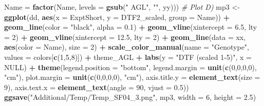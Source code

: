 \documentclass[
]{article}
\newenvironment{Shaded}{\begin{snugshade}}{\end{snugshade}}
\newcommand{\CommentTok}[1]{\textcolor[rgb]{0.56,0.35,0.01}{\textit{#1}}}
\newcommand{\DataTypeTok}[1]{\textcolor[rgb]{0.13,0.29,0.53}{#1}}
\newcommand{\DecValTok}[1]{\textcolor[rgb]{0.00,0.00,0.81}{#1}}
\newcommand{\FloatTok}[1]{\textcolor[rgb]{0.00,0.00,0.81}{#1}}
\newcommand{\KeywordTok}[1]{\textcolor[rgb]{0.13,0.29,0.53}{\textbf{#1}}}
\newcommand{\NormalTok}[1]{#1}
\newcommand{\OperatorTok}[1]{\textcolor[rgb]{0.81,0.36,0.00}{\textbf{#1}}}
\newcommand{\OtherTok}[1]{\textcolor[rgb]{0.56,0.35,0.01}{#1}}
\newcommand{\StringTok}[1]{\textcolor[rgb]{0.31,0.60,0.02}{#1}}
\begin{document}
\begin{Shaded}
\begin{Highlighting}[]
{{{{{{{         \DataTypeTok{Name =} \KeywordTok{factor}\NormalTok{(Name, }\DataTypeTok{levels =} \KeywordTok{gsub}\NormalTok{(}\StringTok{" AGL"}\NormalTok{, }\StringTok{""}\NormalTok{, yy)))}
\CommentTok{# Plot D)}
\NormalTok{mp3 <-}\StringTok{ }\KeywordTok{ggplot}\NormalTok{(dd, }\KeywordTok{aes}\NormalTok{(}\DataTypeTok{x =}\NormalTok{ ExptShort, }\DataTypeTok{y =}\NormalTok{ DTF2_scaled, }\DataTypeTok{group =}\NormalTok{ Name)) }\OperatorTok{+}\StringTok{ }
\StringTok{  }\KeywordTok{geom_line}\NormalTok{(}\DataTypeTok{color =} \StringTok{"black"}\NormalTok{, }\DataTypeTok{alpha =} \FloatTok{0.1}\NormalTok{) }\OperatorTok{+}
\StringTok{  }\KeywordTok{geom_vline}\NormalTok{(}\DataTypeTok{xintercept =} \FloatTok{6.5}\NormalTok{,  }\DataTypeTok{lty =} \DecValTok{2}\NormalTok{) }\OperatorTok{+}\StringTok{ }
\StringTok{  }\KeywordTok{geom_vline}\NormalTok{(}\DataTypeTok{xintercept =} \FloatTok{12.5}\NormalTok{, }\DataTypeTok{lty =} \DecValTok{2}\NormalTok{) }\OperatorTok{+}
\StringTok{  }\KeywordTok{geom_line}\NormalTok{(}\DataTypeTok{data =}\NormalTok{ xx, }\KeywordTok{aes}\NormalTok{(}\DataTypeTok{color =}\NormalTok{ Name), }\DataTypeTok{size =} \DecValTok{2}\NormalTok{) }\OperatorTok{+}\StringTok{ }
\StringTok{  }\KeywordTok{scale_color_manual}\NormalTok{(}\DataTypeTok{name =} \StringTok{"Genotype"}\NormalTok{, }\DataTypeTok{values =}\NormalTok{ colors[}\KeywordTok{c}\NormalTok{(}\DecValTok{1}\NormalTok{,}\DecValTok{5}\NormalTok{,}\DecValTok{8}\NormalTok{)]) }\OperatorTok{+}
\StringTok{  }\NormalTok{theme_AGL }\OperatorTok{+}\StringTok{ }\KeywordTok{labs}\NormalTok{(}\DataTypeTok{y =} \StringTok{"DTF (scaled 1-5)"}\NormalTok{, }\DataTypeTok{x =} \OtherTok{NULL}\NormalTok{) }\OperatorTok{+}
\StringTok{  }\KeywordTok{theme}\NormalTok{(}\DataTypeTok{legend.position =} \StringTok{"bottom"}\NormalTok{, }\DataTypeTok{legend.margin =} \KeywordTok{unit}\NormalTok{(}\KeywordTok{c}\NormalTok{(}\DecValTok{0}\NormalTok{,}\DecValTok{0}\NormalTok{,}\DecValTok{0}\NormalTok{,}\DecValTok{0}\NormalTok{), }\StringTok{"cm"}\NormalTok{),}
        \DataTypeTok{plot.margin =} \KeywordTok{unit}\NormalTok{(}\KeywordTok{c}\NormalTok{(}\DecValTok{0}\NormalTok{,}\DecValTok{0}\NormalTok{,}\DecValTok{0}\NormalTok{,}\DecValTok{0}\NormalTok{), }\StringTok{"cm"}\NormalTok{),}
        \DataTypeTok{axis.title.y =} \KeywordTok{element_text}\NormalTok{(}\DataTypeTok{size =} \DecValTok{9}\NormalTok{),}
        \DataTypeTok{axis.text.x =} \KeywordTok{element_text}\NormalTok{(}\DataTypeTok{angle =} \DecValTok{90}\NormalTok{, }\DataTypeTok{vjust =} \FloatTok{0.5}\NormalTok{))}
\KeywordTok{ggsave}\NormalTok{(}\StringTok{"Additional/Temp/Temp_SF04_3.png"}\NormalTok{, mp3, }\DataTypeTok{width =} \DecValTok{6}\NormalTok{, }\DataTypeTok{height =} \FloatTok{2.5}\NormalTok{)}
}}}}}}}
\end{Highlighting}
\end{Shaded}
\end{document}
